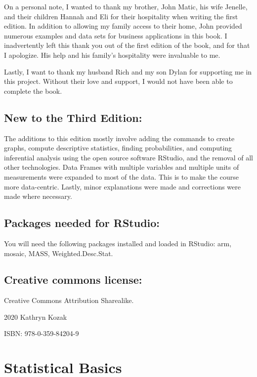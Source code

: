 \documentclass[
]{book}
\begin{document}
On a personal note, I wanted to thank my brother, John Matic, his wife Jenelle, and their children Hannah and Eli for their hospitality when writing the first edition. In addition to allowing my family access to their home, John provided numerous examples and data sets for business applications in this book. I inadvertently left this thank you out of the first edition of the book, and for that I apologize. His help and his family's hospitality were invaluable to me.

Lastly, I want to thank my husband Rich and my son Dylan for supporting me in this project. Without their love and support, I would not have been able to complete the book.

\hypertarget{new-to-the-third-edition}{%
\section{New to the Third Edition:}\label{new-to-the-third-edition}}

The additions to this edition mostly involve adding the commands to create graphs, compute descriptive statistics, finding probabilities, and computing inferential analysis using the open source software RStudio, and the removal of all other technologies. Data Frames with multiple variables and multiple units of measurements were expanded to most of the data. This is to make the course more data-centric. Lastly, minor explanations were made and corrections were made where necessary.

\hypertarget{packages-needed-for-rstudio}{%
\section{Packages needed for RStudio:}\label{packages-needed-for-rstudio}}

You will need the following packages installed and loaded in RStudio: arm, mosaic, MASS, Weighted.Desc.Stat.

\hypertarget{creative-commons-license}{%
\section{Creative commons license:}\label{creative-commons-license}}

Creative Commons Attribution Sharealike.

2020 Kathryn Kozak

ISBN: 978-0-359-84204-9

\hypertarget{statistical-basics}{%
\chapter{Statistical Basics}\label{statistical-basics}}
\end{document}
